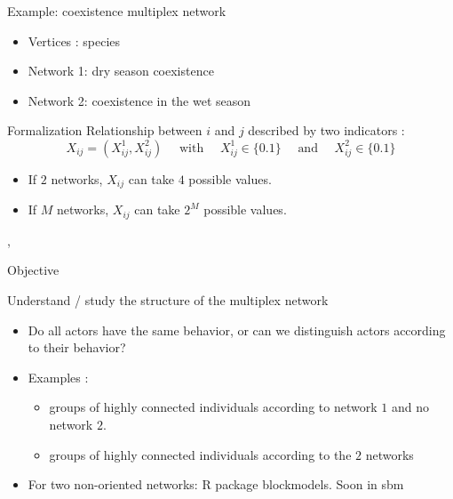 \documentclass[compress,10pt]{beamer}
\begin{document}
\begin{frame}{Example: coexistence multiplex network}
 
\begin{itemize}
\item Vertices : species 
\item Network 1: dry season coexistence 
\item Network 2: coexistence in the wet season
\end{itemize}
 
\end{frame}
   \begin{frame}{Formalization}
 Relationship between $i$ and $j$ described by two indicators : 
$$ X_{ij} = (X^1_{ij}, X^2_{ij}) \quad \mbox{ with } \quad X^1_{ij} \in \{0.1\}\quad \mbox{ and } \quad X^2_{ij} \in \{0.1\}$$ 

\begin{itemize}
\item If $2$ networks, $ X_{ij}$ can take $4$ possible values. 
\item If $M$ networks, $ X_{ij}$ can take $2^M$ possible values.  
\end{itemize}

\cite{kefi}, \cite{Barbillon2016d}
 \end{frame}
 


\begin{frame}{Objective}
\begin{block}{Understand / study the structure of the multiplex network}
\begin{itemize}
\item Do all actors have the same behavior, or can we distinguish actors according to their behavior? 
\item Examples : 
\begin{itemize}
\item groups of highly connected individuals according to network $1$ and no network $2$.
\item groups of highly connected individuals according to the $2$ networks
\end{itemize}
\item For two non-oriented networks: R package \textsf{blockmodels}. \textcolor{dgreen}{Soon in \textsf{sbm}}
\end{itemize}
\end{block}
\end{frame}
\end{document}
